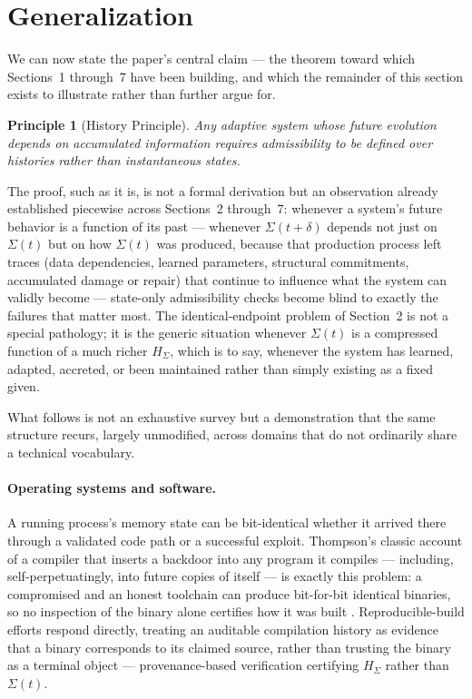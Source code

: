 \documentclass[11pt]{article}
\newtheorem{principle}{Principle}
\begin{document}
\section{Generalization}

We can now state the paper's central claim --- the theorem toward which Sections~1 through~7 have been building, and which the remainder of this section exists to illustrate rather than further argue for.

\begin{principle}[History Principle]
Any adaptive system whose future evolution depends on accumulated information requires admissibility to be defined over histories rather than instantaneous states.
\end{principle}

The proof, such as it is, is not a formal derivation but an observation already established piecewise across Sections~2 through~7: whenever a system's future behavior is a function of its past --- whenever $\Sigma(t+\delta)$ depends not just on $\Sigma(t)$ but on how $\Sigma(t)$ was produced, because that production process left traces (data dependencies, learned parameters, structural commitments, accumulated damage or repair) that continue to influence what the system can validly become --- state-only admissibility checks become blind to exactly the failures that matter most. The identical-endpoint problem of Section~2 is not a special pathology; it is the generic situation whenever $\Sigma(t)$ is a compressed function of a much richer $H_\Sigma$, which is to say, whenever the system has learned, adapted, accreted, or been maintained rather than simply existing as a fixed given.

What follows is not an exhaustive survey but a demonstration that the same structure recurs, largely unmodified, across domains that do not ordinarily share a technical vocabulary.

\paragraph{Operating systems and software.} A running process's memory state can be bit-identical whether it arrived there through a validated code path or a successful exploit. Thompson's classic account of a compiler that inserts a backdoor into any program it compiles --- including, self-perpetuatingly, into future copies of itself --- is exactly this problem: a compromised and an honest toolchain can produce bit-for-bit identical binaries, so no inspection of the binary alone certifies how it was built \cite{thompson1984}. Reproducible-build efforts respond directly, treating an auditable compilation history as evidence that a binary corresponds to its claimed source, rather than trusting the binary as a terminal object \cite{lamb2022} --- provenance-based verification certifying $H_\Sigma$ rather than $\Sigma(t)$.
\end{document}
